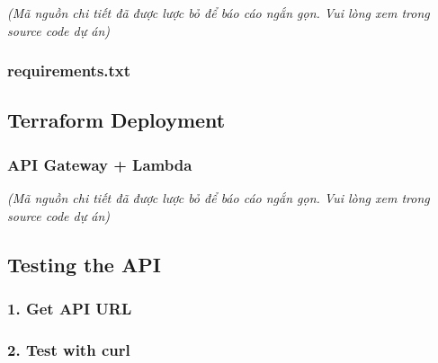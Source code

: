 \emph{(Mã nguồn chi tiết đã được lược bỏ để báo cáo ngắn gọn. Vui lòng
xem trong source code dự án)}

\hypertarget{requirements.txt}{%
\subsubsection{requirements.txt}}

\begin{Shaded}
\begin{Highlighting}[]
\end{Highlighting}
\end{Shaded}

\hypertarget{terraform-deployment}{%
\subsection{Terraform Deployment}}

\hypertarget{api-gateway-lambda}{%
\subsubsection{API Gateway + Lambda}}

\emph{(Mã nguồn chi tiết đã được lược bỏ để báo cáo ngắn gọn. Vui lòng
xem trong source code dự án)}

\hypertarget{testing-the-api}{%
\subsection{Testing the API}}

\hypertarget{get-api-url}{%
\subsubsection{1. Get API URL}}

\begin{Shaded}
\begin{Highlighting}[]
\OperatorTok{=}\VariableTok{$(}\VariableTok{)}
 
\end{Highlighting}
\end{Shaded}

\hypertarget{test-with-curl}{%
\subsubsection{2. Test with curl}}

